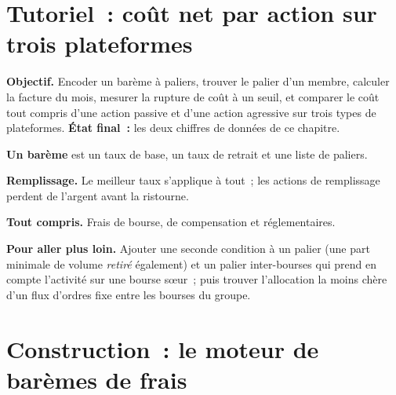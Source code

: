 \section{Tutoriel~: coût net par action sur trois plateformes}\label{tut:m1:getting-access-equities:cost}

\begin{tutorial}
\textbf{Objectif.} Encoder un barème à paliers, trouver le palier d'un membre, calculer la facture du
mois, mesurer la rupture de coût à un seuil, et comparer le coût tout compris d'une action passive
et d'une action agressive sur trois types de plateformes. \textbf{État
final~:} les deux chiffres de données de ce chapitre.
\begin{tutsteps}
\item \textbf{Un barème} est un taux de base, un taux de retrait et une liste de paliers.
\label{lst:m1:getting-access-equities:schedule}
\item \textbf{Remplissage.} Le meilleur taux s'applique à tout~; les actions de
remplissage perdent de l'argent avant la ristourne.
\label{lst:m1:getting-access-equities:padding}
\item \textbf{Tout compris.} Frais de bourse, de compensation et réglementaires.
\end{tutsteps}
\textbf{Pour aller plus loin.} Ajouter une seconde condition à un palier (une part minimale
de volume \emph{retiré} également) et un palier inter-bourses qui prend en compte
l'activité sur une bourse sœur~; puis trouver l'allocation la moins chère d'un flux
d'ordres fixe entre les bourses du groupe.
\end{tutorial}

\section{Construction~: le moteur de barèmes de frais}\label{bld:m1:getting-access-equities:feesched}

